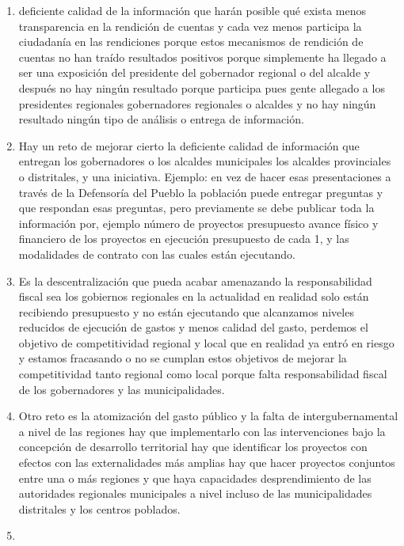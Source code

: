 \documentclass[
  letterpaper,
  DIV=11,
  numbers=noendperiod]{scrartcl}
\begin{document}
\begin{enumerate}
\def\labelenumi{\arabic{enumi}.}
\setcounter{enumi}{3}
\item
  deficiente calidad de la información que harán posible qué exista
  menos transparencia en la rendición de cuentas y cada vez menos
  participa la ciudadanía en las rendiciones porque estos mecanismos de
  rendición de cuentas no han traído resultados positivos porque
  simplemente ha llegado a ser una exposición del presidente del
  gobernador regional o del alcalde y después no hay ningún resultado
  porque participa pues gente allegado a los presidentes regionales
  gobernadores regionales o alcaldes y no hay ningún resultado ningún
  tipo de análisis o entrega de información.
\item
  Hay un reto de mejorar cierto la deficiente calidad de información que
  entregan los gobernadores o los alcaldes municipales los alcaldes
  provinciales o distritales, y una iniciativa. Ejemplo: en vez de hacer
  esas presentaciones a través de la Defensoría del Pueblo la población
  puede entregar preguntas y que respondan esas preguntas, pero
  previamente se debe publicar toda la información por, ejemplo número
  de proyectos presupuesto avance físico y financiero de los proyectos
  en ejecución presupuesto de cada 1, y las modalidades de contrato con
  las cuales están ejecutando.
\item
  Es la descentralización que pueda acabar amenazando la responsabilidad
  fiscal sea los gobiernos regionales en la actualidad en realidad solo
  están recibiendo presupuesto y no están ejecutando que alcanzamos
  niveles reducidos de ejecución de gastos y menos calidad del gasto,
  perdemos el objetivo de competitividad regional y local que en
  realidad ya entró en riesgo y estamos fracasando o no se cumplan estos
  objetivos de mejorar la competitividad tanto regional como local
  porque falta responsabilidad fiscal de los gobernadores y las
  municipalidades.
\item
  Otro reto es la atomización del gasto público y la falta de
  intergubernamental a nivel de las regiones hay que implementarlo con
  las intervenciones bajo la concepción de desarrollo territorial hay
  que identificar los proyectos con efectos con las externalidades más
  amplias hay que hacer proyectos conjuntos entre una o más regiones y
  que haya capacidades desprendimiento de las autoridades regionales
  municipales a nivel incluso de las municipalidades distritales y los
  centros poblados.
\item

\end{enumerate}
\end{document}
